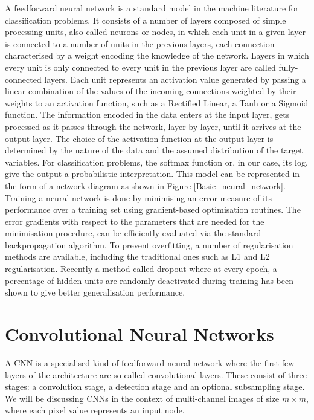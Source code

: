 A feedforward neural network is a standard model in the machine literature for classification problems. It consists of a number of layers composed of simple processing units, also called neurons or nodes, in which each unit in a given layer is connected to a number of units in the previous layers, each connection characterised by a weight encoding the knowledge of the network. Layers in which every unit is only connected to every unit in the previous layer are called fully-connected layers. Each unit represents an activation value generated by passing a linear combination of the values of the incoming connections weighted by their weights to an activation function, such as a Rectified Linear, a Tanh or a Sigmoid function. The information encoded in the data enters at the input layer, gets processed as it passes through the network, layer by layer, until it arrives at the output layer. The choice of the activation function at the output layer is determined by the nature of the data and the assumed distribution of the target variables. For classification problems, the softmax function or, in our case, its log, give the output a probabilistic interpretation. This model can be represented in the form of a network diagram as shown in Figure \ref{Basic_neural_network}.\\

\noindent Training a neural network is done by minimising an error measure of its performance over a training set using gradient-based optimisation routines. The error gradients with respect to the parameters that are needed for the minimisation procedure, can be efficiently evaluated via the standard backpropagation algorithm. To prevent overfitting, a number of regularisation methods are available, including the traditional ones such as L1 and L2 regularisation. Recently a method called dropout \citep{JMLR:v15:srivastava14a} where at every epoch, a percentage of hidden units are randomly deactivated during training has been shown to give better generalisation performance.

\section{Convolutional Neural Networks}

\noindent A CNN is a specialised kind of feedforward neural network where the first few layers of the architecture are so-called convolutional layers. These consist of three stages: a convolution stage, a detection stage and an optional subsampling stage. We will be discussing CNNs in the context of multi-channel images of size $m \times m$, where each pixel value represents an input node. 

